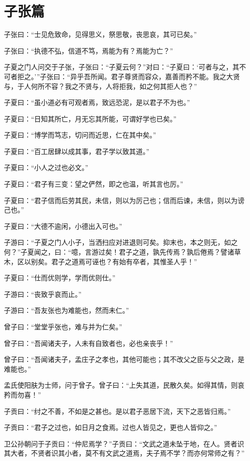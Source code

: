 \documentclass[12pt,a4paper]{ctexbook}
\begin{document}
\section{子张篇}
子张曰：“士见危致命，见得思义，祭思敬，丧思哀，其可已矣。”\par
子张曰：“执德不弘，信道不笃，焉能为有？焉能为亡？”\par
子夏之门人问交于子张，子张曰：“子夏云何？”对曰：“子夏曰：‘可者与之，其不可者拒之。’”子张曰：“异乎吾所闻。君子尊贤而容众，嘉善而矜不能。我之大贤与，于人何所不容？我之不贤与，人将拒我，如之何其拒人也？”\par
子夏曰：“虽小道必有可观者焉，致远恐泥，是以君子不为也。”\par
子夏曰：“日知其所亡，月无忘其所能，可谓好学也已矣。”\par
子夏曰：“博学而笃志，切问而近思，仁在其中矣。”\par
子夏曰：“百工居肆以成其事，君子学以致其道。”\par
子夏曰：“小人之过也必文。”\par
子夏曰：“君子有三变：望之俨然，即之也温，听其言也厉。”\par
子夏曰：“君子信而后劳其民，未信，则以为厉己也；信而后谏，未信，则以为谤己也。”\par
子夏曰：“大德不逾闲，小德出入可也。”\par
子游曰：“子夏之门人小子，当洒扫应对进退则可矣。抑末也，本之则无，如之何？”子夏闻之，曰：“噫，言游过矣！君子之道，孰先传焉？孰后倦焉？譬诸草木，区以别矣。君子之道焉可诬也？有始有卒者，其惟圣人乎！”\par
子夏曰：“仕而优则学，学而优则仕。”\par
子游曰：“丧致乎哀而止。”\par
子游曰：“吾友张也为难能也，然而未仁。”\par
曾子曰：“堂堂乎张也，难与并为仁矣。”\par
曾子曰：“吾闻诸夫子，人未有自致者也，必也亲丧乎！”\par
曾子曰：“吾闻诸夫子，孟庄子之孝也，其他可能也；其不改父之臣与父之政，是难能也。”\par
孟氏使阳肤为士师，问于曾子。曾子曰：“上失其道，民散久矣。如得其情，则哀矜而勿喜！”\par
子贡曰：“纣之不善，不如是之甚也。是以君子恶居下流，天下之恶皆归焉。”\par
子贡曰：“君子之过也，如日月之食焉。过也人皆见之，更也人皆仰之。”\par
卫公孙朝问于子贡曰：“仲尼焉学？”子贡曰：“文武之道未坠于地，在人。贤者识其大者，不贤者识其小者，莫不有文武之道焉，夫子焉不学？而亦何常师之有？”\par
\end{document}

